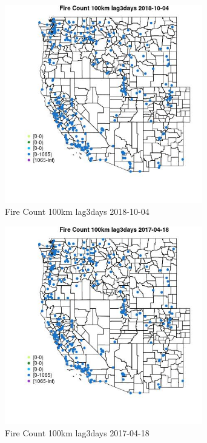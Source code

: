 \begin{figure} 
\centering  
\includegraphics[width=0.77\textwidth]{Code_Outputs/Report_ML_input_PM25_Step4_part_f_de_duplicated_aves_prioritize_24hr_obswNAs_MapObsFire_Count_100km_lag3days2018-10-04.jpg} 
\caption{\label{fig:Report_ML_input_PM25_Step4_part_f_de_duplicated_aves_prioritize_24hr_obswNAsMapObsFire_Count_100km_lag3days2018-10-04}Fire Count 100km lag3days 2018-10-04} 
\end{figure} 
 

\begin{figure} 
\centering  
\includegraphics[width=0.77\textwidth]{Code_Outputs/Report_ML_input_PM25_Step4_part_f_de_duplicated_aves_prioritize_24hr_obswNAs_MapObsFire_Count_100km_lag3days2017-04-18.jpg} 
\caption{\label{fig:Report_ML_input_PM25_Step4_part_f_de_duplicated_aves_prioritize_24hr_obswNAsMapObsFire_Count_100km_lag3days2017-04-18}Fire Count 100km lag3days 2017-04-18} 
\end{figure} 
 

